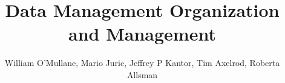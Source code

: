 \documentclass[DM,lsstdraft,SDP,toc]{lsstdoc}
\begin{document}
\title  {Data Management Organization and Management }
\setDocTitle[DM PMP] {}

\author   {William O'Mullane, Mario Juric, Jeffrey P Kantor,  Tim Axelrod,  Roberta Allsman}                %
\setDocDate     {\today}              %

%
%

%
%
\maketitle

%
%





\appendix



\end{document}
